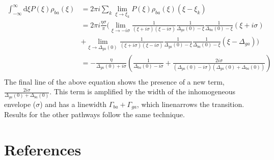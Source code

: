 \documentclass[aip, jcp, reprint, onecolumn]{revtex4-2}
\begin{document}
\begin{widetext}
	\begin{equation}
		\begin{split}
			\int_{-\infty}^\infty \mathrm{d}\xi P(\xi) \rho_{ba}(\xi) &= 2\pi i \sum_k \lim_{\xi \rightarrow \xi_k} P(\xi) \rho_{ba}(\xi) (\xi - \xi_k)\\
			&= 2\pi i \frac{\eta \sigma}{\pi} ( \lim_{\xi \rightarrow -i\sigma} \frac{1}{(\xi + i\sigma)(\xi - i\sigma)} \frac{1}{\Delta_{ga}(0) - \xi} \frac{1}{\Delta_{ba}(0) - \xi} (\xi + i \sigma) \\ &+
			\lim_{\xi \rightarrow \Delta_{ga}(0)} \frac{1}{(\xi + i\sigma)(\xi - i\sigma)} \frac{1}{\Delta_{ga}(0) - \xi} \frac{1}{\Delta_{ba}(0) - \xi} (\xi - \Delta_{ga}))\\
			&= -\frac{\eta}{\Delta_{ga}(0) + i \sigma} (\frac{1}{\Delta_{ba}(0) - i \sigma} + \frac{2i\sigma}{(\Delta_{ga}(0) - i \sigma)(\Delta_{ga}(0) + \Delta_{ba}(0))})\\
		\end{split}
	\end{equation}
The final line of the above equation shows the presence of a new term, $\frac{2i\sigma}{\Delta_{ga}(0) + \Delta_{ba}(0)}$. 
This term is amplified by the width of the inhomogeneous envelope ($\sigma$) and has a linewidth $\Gamma_{ba} + \Gamma_{ga}$, which linenarrows the transition. 
Results for the other pathways follow the same technique.
\end{widetext}


\section{References}

\end{document}
